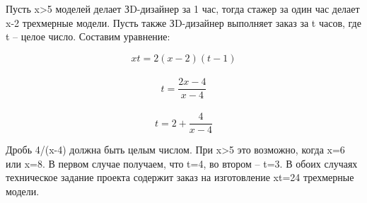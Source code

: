 \solutionSection

Пусть x>5 моделей делает ЗD-дизайнер за 1 час, тогда стажер за один час делает x-2 трехмерные модели. Пусть также ЗD-дизайнер выполняет заказ за t часов, где t – целое число. Составим уравнение: 

\begin{displaymath}
xt=2(x-2)(t-1)
\end{displaymath}\\
\begin{displaymath}
t=\frac{2x-4}{x-4}
\end{displaymath}\\
\begin{displaymath}
t= 2 + \frac{4}{x-4}
\end{displaymath}

Дробь 4/(x-4) должна быть целым числом. При x>5 это возможно, когда x=6 или x=8. В первом случае получаем, что t=4, во втором – t=3. В обоих случаях техническое задание проекта содержит заказ на изготовление xt=24 трехмерные модели.

